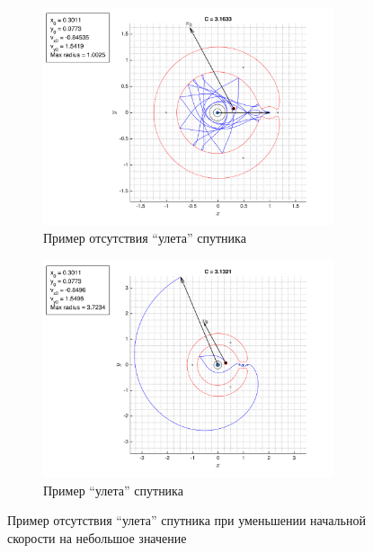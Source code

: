 \documentclass[a4paper,12pt]{article}
\newcommand{\quotes}[1]{``#1''}
\begin{document}
\begin{figure}[h!]
	\centering
	\begin{subfigure}{.495\textwidth}
		\includegraphics[width=0.94\textwidth]{../../img/sim_r3bp_v0_inside.png}
		\caption{Пример отсутствия \quotes{улета} спутника}
		\label{fig:sim_r3bp_v0:sim_r3bp_v0_inside}
	\end{subfigure}
	\begin{subfigure}{.495\textwidth}
		\includegraphics[width=0.94\textwidth]{../../img/sim_r3bp_v0_outside.png}
		\caption{Пример \quotes{улета} спутника}
		\label{fig:sim_r3bp_v0:sim_r3bp_v0_outside}
	\end{subfigure}
	\caption{Пример отсутствия \quotes{улета} спутника при уменьшении начальной скорости на небольшое значение}
\end{figure}
\end{document}

